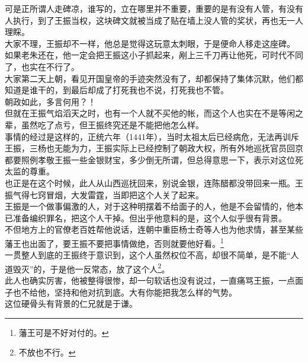 \begin{multicols}{\theparacolNo}
可是正所谓人走碑凉，谁写的，立在哪里并不重要，重要的是有没有人管，有没有人执行，到了王振当权，这块碑文就被当成了贴在墙上没人管的奖状，再也无一人理睬。\\

大家不理，王振却不一样，他总是觉得这玩意太刺眼，于是便命人移走这座碑。\\

如果老朱还在，他一定会把王振这小子抓起来，剐上三千刀再让他死，可时代不同了，也实在不行了。\\

大家第二天上朝，看见开国皇帝的手迹突然没有了，却都保持了集体沉默，他们都知道是谁干的，到最后却成了打死我也不说，打死我也不管。\\

朝政如此，多言何用？！\\

但就在王振气焰滔天之时，也有一个人就不买他的帐，而这个人也实在不是等闲之辈，虽然吃了点亏，但王振终究还是不能把他怎么样。\\

事情的经过是这样的，正统六年（1441年），当时太祖太后已经病危，无法再训斥王振，三杨也无能为力，王振实际上已经控制了朝政大权，所有外地巡抚官员回京都要照例孝敬王振一些金银财宝，多少倒无所谓，但总得意思一下，表示对这位死太监的尊重。\\

也正是在这个时候，此人从山西巡抚回来，别说金银，连陈醋都没带回来一瓶。王振气得七窍冒烟，大发雷霆，当即把这个人关了起来。\\

王振是一个做事偏激的人，对于这种明摆着不给面子的人，他是不会留情的，他本已准备编织罪名，把这个人干掉。但出乎他意料的是，这个人似乎很有背景。\\

不但地方上的官僚老百姓帮他说话，连朝中重臣杨士奇等人也为他求情，甚至某些藩王也出面了，要王振不要把事情做绝，否则就要他好看。\footnote{藩王可是不好对付的。}\\

一贯整人到底的王振终于意识到，这个人虽然权位不高，却很不简单，是不能“人道毁灭”的，于是他一反常态，放了这个人\footnote{不放也不行。}。\\

此人也确实厉害，他被整得很惨，却一句软话也没有说过，一直痛骂王振，一点面子也不给他，坚持和他对抗到底。大有你能把我怎么样的气势。\\

这位硬骨头有背景的仁兄就是于谦。\\


\end{multicols}
